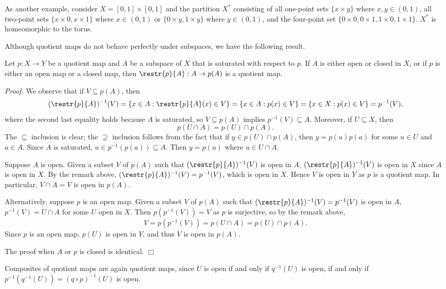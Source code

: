 As another example, consider $X = [0, 1] \times [0, 1]$ and the partition $X^*$ consisting of all one-point sets $\{x \times y\}$ where $x,y \in (0, 1)$, all two-point sets $\{x \times 0, x\times 1\}$ where $x \in (0, 1)$ or $\{0 \times y, 1 \times y\}$ where $y \in (0, 1)$, and the four-point set $\{0 \times 0, 0 \times 1, 1\times 0, 1 \times 1\}$. $X^*$ is homeomorphic to the torus.

Although quotient maps do not behave perfectly under subspaces, we have the following result.

\begin{theorem}\label{2.76}
    Let $p: X \rightarrow Y$ be a quotient map and $A$ be a subspace of $X$ that is saturated with respect to $p$. If $A$ is either open or closed in $X$, or if $p$ is either an open map or a closed map, then $\restr{p}{A}: A \rightarrow p(A)$ is a quotient map.
\end{theorem}
{\it Proof.} We observe that if $V \subseteq p(A)$, then
$$(\restr{p}{A})^{-1}(V) = \{ x \in A: \restr{p}{A}(x) \in V \} = \{ x \in A: p(x) \in V \} = \{ x \in X: p(x) \in V \} = p^{-1}(V),$$
where the second last equality holds because $A$ is saturated, so $V \subseteq p(A)$ implies $p^{-1}(V) \subseteq A$. Moreover, if $U \subseteq X$, then
$$p(U \cap A) = p(U) \cap p(A).$$
The $\subseteq$ inclusion is clear; the $\supseteq$ inclusion follows from the fact that if $y \in p(U) \cap p(A)$, then $y = p(u) p(a)$ for some $u \in U$ and $a \in A$. Since $A$ is saturated, $u \in p^{-1}(p(a)) \subseteq A$. Then $y = p(u)$ where $u \in U \cap A$.

Suppose $A$ is open. Given a subset $V$ of $p(A)$ such that $(\restr{p}{A})^{-1}(V)$ is open in $A$, $(\restr{p}{A})^{-1}(V)$ is open in $X$ since $A$ is open in $X$. By the remark above, $(\restr{p}{A})^{-1}(V) = p^{-1}(V)$, which is open in $X$. Hence $V$ is open in $Y$ as $p$ is a quotient map. In particular, $V \cap A = V$ is open in $p(A)$.

Alternatively, suppose $p$ is an open map. Given a subset $V$ of $p(A)$ such that $(\restr{p}{A})^{-1}(V) = p^{-1}(V)$ is open in $A$, $p^{-1}(V) = U \cap A$ for some $U$ open in $X$. Then $p(p^{-1}(V)) = V$ as $p$ is surjective, so by the remark above,
$$V = p(p^{-1}(V)) = p(U \cap A) = p(U) \cap p(A).$$
Since $p$ is an open map, $p(U)$ is open in $Y$, and thus $V$ is open in $p(A)$.

The proof when $A$ or $p$ is closed is identical. $\Box$

Composites of quotient maps are again quotient maps, since $U$ is open if and only if $q^{-1}(U)$ is open, if and only if $p^{-1}(q^{-1}(U)) = (q \circ p)^{-1}(U)$ is open.

